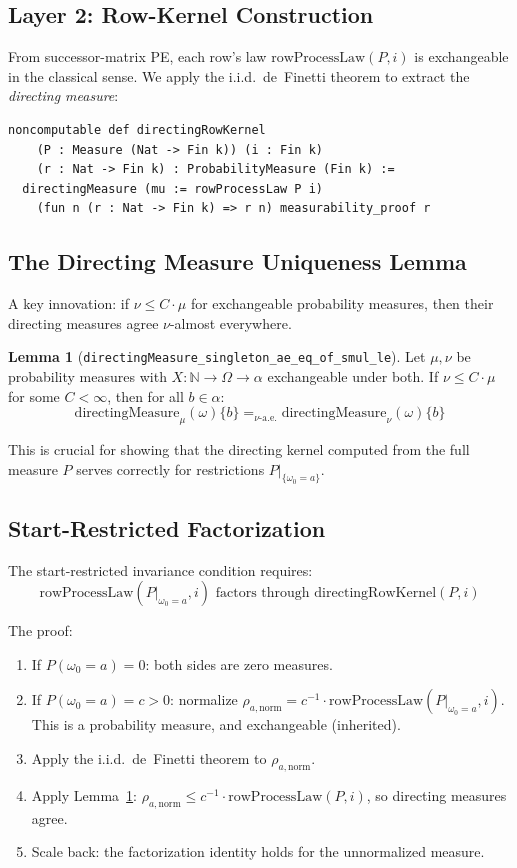 \documentclass[11pt,a4paper]{article}
\theoremstyle{definition}
\newtheorem{lemma}[theorem]{Lemma}
\begin{document}
\subsection{Layer 2: Row-Kernel Construction}

From successor-matrix PE, each row's law $\mathrm{rowProcessLaw}(P, i)$ is
exchangeable in the classical sense. We apply the i.i.d.\ de~Finetti theorem
to extract the \emph{directing measure}:

\begin{lstlisting}
noncomputable def directingRowKernel
    (P : Measure (Nat -> Fin k)) (i : Fin k)
    (r : Nat -> Fin k) : ProbabilityMeasure (Fin k) :=
  directingMeasure (mu := rowProcessLaw P i)
    (fun n (r : Nat -> Fin k) => r n) measurability_proof r
\end{lstlisting}

\subsection{The Directing Measure Uniqueness Lemma}

A key innovation: if $\nu \leq C \cdot \mu$ for exchangeable probability
measures, then their directing measures agree $\nu$-almost everywhere.

\begin{lemma}[\texttt{directingMeasure\_singleton\_ae\_eq\_of\_smul\_le}]
\label{lem:unique}
Let $\mu, \nu$ be probability measures with $X : \mathbb{N} \to \Omega \to \alpha$
exchangeable under both. If $\nu \leq C \cdot \mu$ for some $C < \infty$, then
for all $b \in \alpha$:
\[
\mathrm{directingMeasure}_\mu(\omega)\{b\} =_{\nu\text{-a.e.}}
\mathrm{directingMeasure}_\nu(\omega)\{b\}
\]
\end{lemma}

This is crucial for showing that the directing kernel computed from the full
measure $P$ serves correctly for restrictions $P|_{\{\omega_0 = a\}}$.

\subsection{Start-Restricted Factorization}

The start-restricted invariance condition requires:
\[
\mathrm{rowProcessLaw}(P|_{\omega_0 = a}, i) \text{ factors through }
\mathrm{directingRowKernel}(P, i)
\]

The proof:
\begin{enumerate}
\item If $P(\omega_0 = a) = 0$: both sides are zero measures.
\item If $P(\omega_0 = a) = c > 0$: normalize $\rho_{a,\text{norm}} = c^{-1} \cdot \mathrm{rowProcessLaw}(P|_{\omega_0=a}, i)$.
  This is a probability measure, and exchangeable (inherited).
\item Apply the i.i.d.\ de~Finetti theorem to $\rho_{a,\text{norm}}$.
\item Apply Lemma~\ref{lem:unique}: $\rho_{a,\text{norm}} \leq c^{-1} \cdot \mathrm{rowProcessLaw}(P, i)$,
  so directing measures agree.
\item Scale back: the factorization identity holds for the unnormalized measure.
\end{enumerate}
\end{document}
